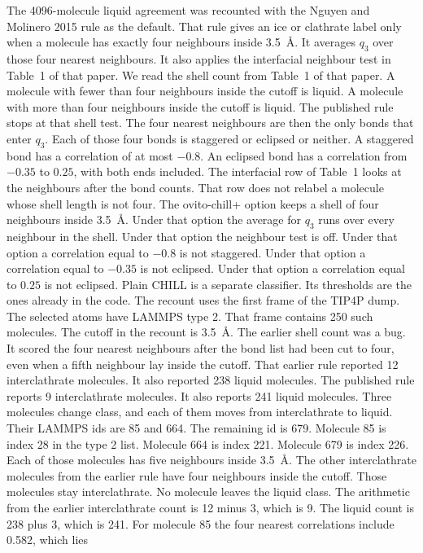The 4096-molecule liquid agreement was recounted with the Nguyen and
Molinero 2015 rule as the default.
That rule gives an ice or clathrate label only when a molecule has
exactly four neighbours inside 3.5~\AA.
It averages $q_3$ over those four nearest neighbours.
It also applies the interfacial neighbour test in Table~1 of that paper.
We read the shell count from Table~1 of that paper.
A molecule with fewer than four neighbours inside the cutoff is liquid.
A molecule with more than four neighbours inside the cutoff is liquid.
The published rule stops at that shell test.
The four nearest neighbours are then the only bonds that enter $q_3$.
Each of those four bonds is staggered or eclipsed or neither.
A staggered bond has a correlation of at most $-0.8$.
An eclipsed bond has a correlation from $-0.35$ to $0.25$, with both
ends included.
The interfacial row of Table~1 looks at the neighbours after the bond
counts.
That row does not relabel a molecule whose shell length is not four.
The ovito-chill+ option keeps a shell of four neighbours inside 3.5~\AA.
Under that option the average for $q_3$ runs over every neighbour in the
shell.
Under that option the neighbour test is off.
Under that option a correlation equal to $-0.8$ is not staggered.
Under that option a correlation equal to $-0.35$ is not eclipsed.
Under that option a correlation equal to $0.25$ is not eclipsed.
Plain CHILL is a separate classifier.
Its thresholds are the ones already in the code.
The recount uses the first frame of the TIP4P dump.
The selected atoms have LAMMPS type 2.
That frame contains 250 such molecules.
The cutoff in the recount is 3.5~\AA.
The earlier shell count was a bug.
It scored the four nearest neighbours after the bond list had been cut
to four, even when a fifth neighbour lay inside the cutoff.
That earlier rule reported 12 interclathrate molecules.
It also reported 238 liquid molecules.
The published rule reports 9 interclathrate molecules.
It also reports 241 liquid molecules.
Three molecules change class, and each of them moves from interclathrate
to liquid.
Their LAMMPS ids are 85 and 664.
The remaining id is 679.
Molecule 85 is index 28 in the type 2 list.
Molecule 664 is index 221.
Molecule 679 is index 226.
Each of those molecules has five neighbours inside 3.5~\AA.
The other interclathrate molecules from the earlier rule have four
neighbours inside the cutoff.
Those molecules stay interclathrate.
No molecule leaves the liquid class.
The arithmetic from the earlier interclathrate count is 12 minus 3,
which is 9.
The liquid count is 238 plus 3, which is 241.
For molecule 85 the four nearest correlations include 0.582, which lies
